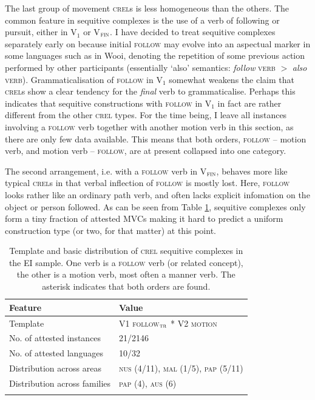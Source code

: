 The last group of movement \textsc{crel}s is less homogeneous than the others. The common feature in sequitive complexes is the use of a verb of following or pursuit, either in V$_{1}$ or V$_{\textsc{fin}}$. I have decided to treat sequitive complexes separately early on because initial \textsc{follow} may evolve into an aspectual marker in some languages such as in Wooi, denoting the repetition of some previous action performed by other participants (essentially `also' semantics: \textit{follow} \textsc{verb} $>$ \textit{also} \textsc{verb}). Grammaticalisation of \textsc{follow} in V$_{1}$ somewhat weakens the claim that \textsc{crel}s show a clear tendency for the \emph{final} verb to grammaticalise. Perhaps this indicates that sequitive constructions with \textsc{follow} in V$_{1}$ in fact are rather different from the other \textsc{crel} types. For the time being, I leave all instances involving a \textsc{follow} verb together with another motion verb in this section, as there are only few data available. This means that both orders, \textsc{follow} -- motion verb, and motion verb -- \textsc{follow}, are at present collapsed into one category.

The second arrangement, i.e. with a \textsc{follow} verb in V$_{\textsc{fin}}$, behaves more like typical \textsc{crel}s in that verbal inflection of \textsc{follow} is mostly lost. Here, \textsc{follow} looks rather like an ordinary path verb, and often lacks explicit infomation on the object or person followed. As can be seen from Table \ref{table:basiccrelseq}, sequitive complexes only form a tiny fraction of attested MVCs making it hard to predict a uniform construction type (or two, for that matter) at this point.

\begin{table}
\begin{tabular}{ll}
\lsptoprule
Feature&Value\tabularnewline
\midrule
Template&V1 \textsc{follow$_{\textsc{tr}}$} * V2 \textsc{motion}\tabularnewline
No. of attested instances& 21/2146 \tabularnewline
No. of attested languages& 10/32 \tabularnewline
Distribution across areas& \textsc{nus} (4/11), \textsc{mal} (1/5), \textsc{pap} (5/11) \tabularnewline
Distribution across families& \textsc{pap} (4), \textsc{aus} (6) \tabularnewline
\lspbottomrule
\end{tabular}
\caption[Template and basic distribution of \textsc{crel} sequitive complexes]{Template and basic distribution of \textsc{crel} sequitive complexes in the EI sample. One verb is a \textsc{follow} verb (or related concept), the other is a motion verb, most often a manner verb. The asterisk indicates that both orders are found.}
\label{table:basiccrelseq}
\end{table}

